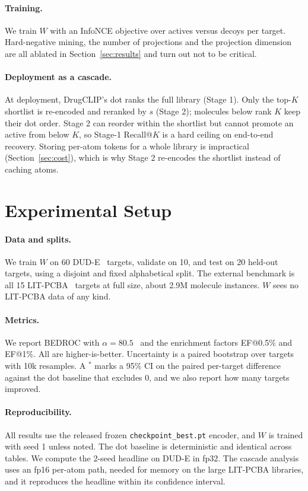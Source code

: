 \documentclass[10pt,letterpaper,twocolumn]{article}
\begin{document}
\paragraph{Training.} We train $W$ with an InfoNCE objective over actives versus decoys per target. Hard-negative mining, the number of projections and the projection dimension are all ablated in Section~\ref{sec:results} and turn out not to be critical.

\paragraph{Deployment as a cascade.} At deployment, DrugCLIP's dot ranks the full library (Stage 1). Only the top-$K$ shortlist is re-encoded and reranked by $s$ (Stage 2); molecules below rank $K$ keep their dot order. Stage 2 can reorder within the shortlist but cannot promote an active from below $K$, so Stage-1 Recall@$K$ is a hard ceiling on end-to-end recovery. Storing per-atom tokens for a whole library is impractical (Section~\ref{sec:cost}), which is why Stage 2 re-encodes the shortlist instead of caching atoms.

\section{Experimental Setup}

\paragraph{Data and splits.} We train $W$ on 60 DUD-E~\cite{dude} targets, validate on 10, and test on 20 held-out targets, using a disjoint and fixed alphabetical split. The external benchmark is all 15 LIT-PCBA~\cite{litpcba} targets at full size, about 2.9M molecule instances. $W$ sees no LIT-PCBA data of any kind.

\paragraph{Metrics.} We report BEDROC with $\alpha = 80.5$~\cite{bedroc} and the enrichment factors EF@0.5\% and EF@1\%. All are higher-is-better. Uncertainty is a paired bootstrap over targets with 10k resamples. A $^{*}$ marks a 95\% CI on the paired per-target difference against the dot baseline that excludes 0, and we also report how many targets improved.

\paragraph{Reproducibility.} All results use the released frozen \texttt{checkpoint\_best.pt} encoder, and $W$ is trained with seed 1 unless noted. The dot baseline is deterministic and identical across tables. We compute the 2-seed headline on DUD-E in fp32. The cascade analysis uses an fp16 per-atom path, needed for memory on the large LIT-PCBA libraries, and it reproduces the headline within its confidence interval.
\end{document}
